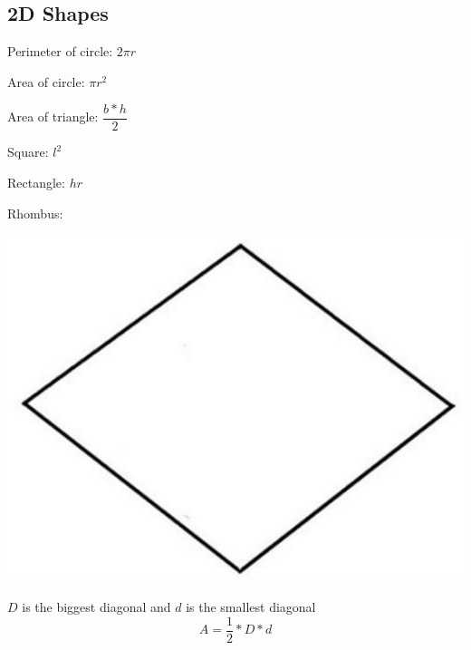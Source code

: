 \subsection{2D Shapes}


Perimeter of circle: $ 2 \pi r $

Area of circle: $ \pi r^2 $

Area of triangle: $ \dfrac{b * h}{2} $

Square: $ l^2 $

Rectangle: $ hr $

Rhombus:
\begin{center}
    \includegraphics[scale=.2, keepaspectratio]{./theoretical/img/rhombus.png}
\end{center}
$D$ is the biggest diagonal and $d$ is the smallest diagonal
$$ A = \dfrac{1}{2} * D * d $$